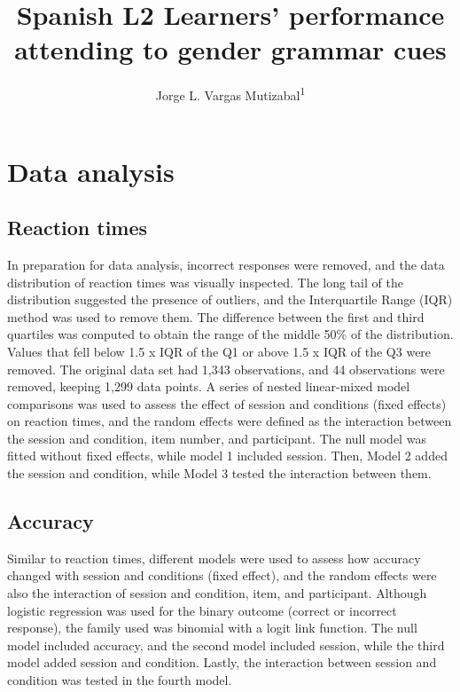 \documentclass[
  man,floatsintext]{apa6}
\title{Spanish L2 Learners' performance attending to gender grammar cues}
\author{Jorge L. Vargas Mutizabal\textsuperscript{1}}
\date{}
\affiliation{\vspace{0.5cm}\textsuperscript{1} Rutgers - The State University of New Jersey\\\textsuperscript{} }
\begin{document}
\maketitle

\section{Data analysis}\label{data-analysis}

\subsection{Reaction times}\label{reaction-times}

In preparation for data analysis, incorrect responses were removed, and the data distribution of reaction times was visually inspected. The long tail of the distribution suggested the presence of outliers, and the Interquartile Range (IQR) method was used to remove them. The difference between the first and third quartiles was computed to obtain the range of the middle 50\% of the distribution. Values that fell below 1.5 x IQR of the Q1 or above 1.5 x IQR of the Q3 were removed. The original data set had 1,343 observations, and 44 observations were removed, keeping 1,299 data points.
A series of nested linear-mixed model comparisons was used to assess the effect of session and conditions (fixed effects) on reaction times, and the random effects were defined as the interaction between the session and condition, item number, and participant. The null model was fitted without fixed effects, while model 1 included session. Then, Model 2 added the session and condition, while Model 3 tested the interaction between them.

\subsection{Accuracy}\label{accuracy}

Similar to reaction times, different models were used to assess how accuracy changed with session and conditions (fixed effect), and the random effects were also the interaction of session and condition, item, and participant. Although logistic regression was used for the binary outcome (correct or incorrect response), the family used was binomial with a logit link function. The null model included accuracy, and the second model included session, while the third model added session and condition. Lastly, the interaction between session and condition was tested in the fourth model.
\end{document}
